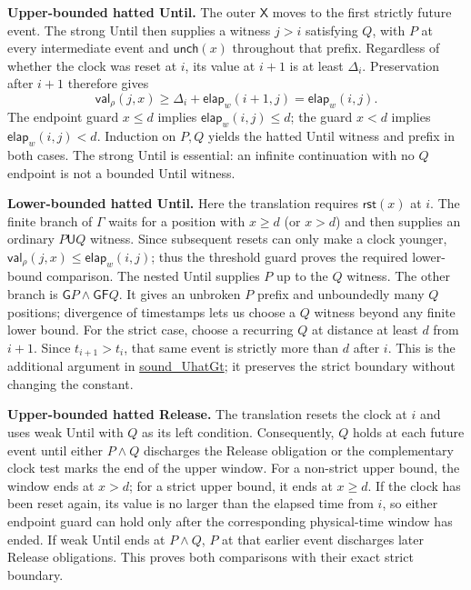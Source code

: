 \documentclass{ieeeaccess}
\newcommand{\Until}{\mathbin{\mathsf{U}}}
\newcommand{\Next}{\mathsf{X}}
\newcommand{\Always}{\mathsf{G}}
\newcommand{\Eventually}{\mathsf{F}}
\newcommand{\Reset}{\mathsf{rst}}
\newcommand{\Unch}{\mathsf{unch}}
\newcommand{\CVal}{\mathsf{val}}
\newcommand{\elapsed}{\mathsf{elap}}
\newcommand{\runinhead}[1]{\par\noindent\textbf{#1}\enspace}
\newcommand{\Rocqid}[1]{\url{#1}}
\begin{document}
\runinhead{Upper-bounded hatted Until.}
The outer $\Next$ moves to the first strictly future event. The strong Until
then supplies a witness $j>i$ satisfying $Q$, with $P$ at every intermediate
event and $\Unch(x)$ throughout that prefix. Regardless of whether the clock
was reset at $i$, its value at $i+1$ is at least $\Delta_i$.
Preservation after $i+1$ therefore gives
\[
\CVal_\rho(j,x)\ge
\Delta_i+\elapsed_w(i+1,j)=\elapsed_w(i,j).
\]
The endpoint guard $x\le d$ implies $\elapsed_w(i,j)\le d$; the guard $x<d$
implies $\elapsed_w(i,j)<d$. Induction on $P,Q$ yields the hatted Until
witness and prefix in both cases. The strong Until is essential: an infinite
continuation with no $Q$ endpoint is not a bounded Until witness.

\runinhead{Lower-bounded hatted Until.}
Here the translation requires $\Reset(x)$ at $i$. The finite branch of
$\Gamma$ waits for a position with $x\ge d$ (or $x>d$) and then supplies an
ordinary $P\Until Q$ witness. Since subsequent resets can only make a clock
younger, $\CVal_\rho(j,x)\le\elapsed_w(i,j)$; thus the threshold guard proves
the required lower-bound comparison. The nested Until supplies $P$ up to the
$Q$ witness. The other branch is
$\Always P\land\Always\Eventually Q$. It gives an unbroken $P$ prefix and
unboundedly many $Q$ positions; divergence of timestamps lets us choose a
$Q$ witness beyond any finite lower bound. For the strict case, choose a
recurring $Q$ at distance at least $d$ from $i+1$. Since
$t_{i+1}>t_i$, that same event is strictly more than $d$ after $i$. This is
the additional argument in \Rocqid{sound_UhatGt}; it preserves the strict
boundary without changing the constant.

\runinhead{Upper-bounded hatted Release.}
The translation resets the clock at $i$ and uses weak Until with $Q$ as its
left condition. Consequently, $Q$ holds at each future event until either
$P\land Q$ discharges the Release obligation or the complementary clock test
marks the end of the upper window. For a non-strict upper bound, the window
ends at $x>d$; for a strict upper bound, it ends at $x\ge d$. If the clock
has been reset again, its value is no larger than the elapsed time from $i$,
so either endpoint guard can hold only after the corresponding physical-time
window has ended. If weak Until ends at $P\land Q$, $P$ at that earlier event
discharges later Release obligations. This proves both comparisons with their
exact strict boundary.
\end{document}
